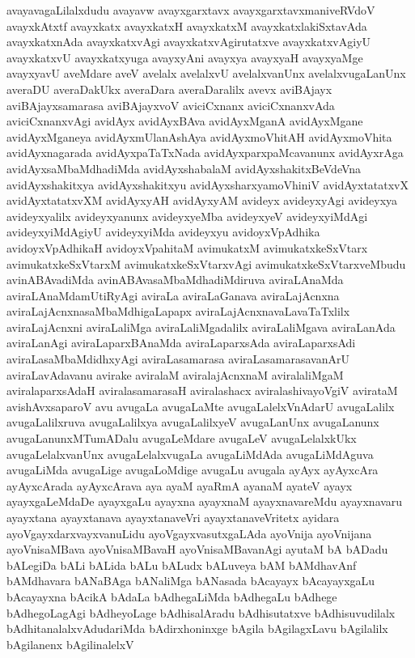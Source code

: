 {avayavagaLilalxdudu
avayavw
avayxgarxtavx
avayxgarxtavxmaniveRVdoV
avayxkAtxtf
avayxkatx
avayxkatxH
avayxkatxM
avayxkatxlakiSxtavAda
avayxkatxnAda
avayxkatxvAgi
avayxkatxvAgirutatxve
avayxkatxvAgiyU
avayxkatxvU
avayxkatxyuga
avayxyAni
avayxya
avayxyaH
avayxyaMge
avayxyavU
aveMdare
aveV
avelalx
avelalxvU
avelalxvanUnx
avelalxvugaLanUnx
averaDU
averaDakUkx
averaDara
averaDaralilx
avevx
aviBAjayx
aviBAjayxsamarasa
aviBAjayxvoV
aviciCxnanx
aviciCxnanxvAda
aviciCxnanxvAgi
avidAyx
avidAyxBAva
avidAyxMganA
avidAyxMgane
avidAyxMganeya
avidAyxmUlanAshAya
avidAyxmoVhitAH
avidAyxmoVhita
avidAyxnagarada
avidAyxpaTaTxNada
avidAyxparxpaMcavanunx
avidAyxrAga
avidAyxsaMbaMdhadiMda
avidAyxshabalaM
avidAyxshakitxBeVdeVna
avidAyxshakitxya
avidAyxshakitxyu
avidAyxsharxyamoVhiniV
avidAyxtatatxvX
avidAyxtatatxvXM
avidAyxyAH
avidAyxyAM
avideyx
avideyxyAgi
avideyxya
avideyxyalilx
avideyxyanunx
avideyxyeMba
avideyxyeV
avideyxyiMdAgi
avideyxyiMdAgiyU
avideyxyiMda
avideyxyu
avidoyxVpAdhika
avidoyxVpAdhikaH
avidoyxVpahitaM
avimukatxM
avimukatxkeSxVtarx
avimukatxkeSxVtarxM
avimukatxkeSxVtarxvAgi
avimukatxkeSxVtarxveMbudu
avinABAvadiMda
avinABAvasaMbaMdhadiMdiruva
aviraLAnaMda
aviraLAnaMdamUtiRyAgi
aviraLa
aviraLaGanava
aviraLajAcnxna
aviraLajAcnxnasaMbaMdhigaLapapx
aviraLajAcnxnavaLavaTaTxlilx
aviraLajAcnxni
aviraLaliMga
aviraLaliMgadalilx
aviraLaliMgava
aviraLanAda
aviraLanAgi
aviraLaparxBAnaMda
aviraLaparxsAda
aviraLaparxsAdi
aviraLasaMbaMdidhxyAgi
aviraLasamarasa
aviraLasamarasavanArU
aviraLavAdavanu
avirake
aviralaM
aviralajAcnxnaM
aviralaliMgaM
aviralaparxsAdaH
aviralasamarasaH
aviralashacx
aviralashivayoVgiV
avirataM
avishAvxsaparoV
avu
avugaLa
avugaLaMte
avugaLalelxVnAdarU
avugaLalilx
avugaLalilxruva
avugaLalilxya
avugaLalilxyeV
avugaLanUnx
avugaLanunx
avugaLanunxMTumADalu
avugaLeMdare
avugaLeV
avugaLelalxkUkx
avugaLelalxvanUnx
avugaLelalxvugaLa
avugaLiMdAda
avugaLiMdAguva
avugaLiMda
avugaLige
avugaLoMdige
avugaLu
avugala
ayAyx
ayAyxcAra
ayAyxcArada
ayAyxcArava
aya
ayaM
ayaRmA
ayanaM
ayateV
ayayx
ayayxgaLeMdaDe
ayayxgaLu
ayayxna
ayayxnaM
ayayxnavareMdu
ayayxnavaru
ayayxtana
ayayxtanava
ayayxtanaveVri
ayayxtanaveVritetx
ayidara
ayoVgayxdarxvayxvanuLidu
ayoVgayxvasutxgaLAda
ayoVnija
ayoVnijana
ayoVnisaMBava
ayoVnisaMBavaH
ayoVnisaMBavanAgi
ayutaM
bA
bADadu
bALegiDa
bALi
bALida
bALu
bALudx
bALuveya
bAM
bAMdhavAnf
bAMdhavara
bANaBAga
bANaliMga
bANasada
bAcayayx
bAcayayxgaLu
bAcayayxna
bAcikA
bAdaLa
bAdhegaLiMda
bAdhegaLu
bAdhege
bAdhegoLagAgi
bAdheyoLage
bAdhisalAradu
bAdhisutatxve
bAdhisuvudilalx
bAdhitanalalxvAdudariMda
bAdirxhoninxge
bAgila
bAgilagxLavu
bAgilalilx
bAgilanenx
bAgilinalelxV
}
